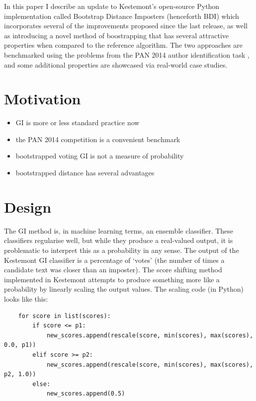 \documentclass[
    hf,
]{ceurart}
\begin{document}
In this paper I describe an update to Kestemont's open-source Python
implementation called Bootstrap Distance Imposters (henceforth BDI) which
incorporates several of the improvements proposed since the last release, as
well as introducing a novel method of boostrapping that has several attractive
properties when compared to the reference algorithm. The two approaches are
benchmarked using the problems from the PAN 2014 author identification task
\cite{pan_2014}, and some additional properties are showcased via real-world
case studies.

\section{Motivation}
\begin{itemize}
    \item GI is more or less standard practice now
    \item the PAN 2014 competition is a convenient benchmark
    \item bootstrapped voting GI is not a measure of probability
    \item bootstrapped distance has several advantages
\end{itemize}
\section{Design}

The GI method is, in machine learning terms, an ensemble classifier. These
classifiers regularise well, but while they produce a real-valued output, it is
problematic to interpret this as a probability in any sense. The output of the
Kestemont GI classifier is a percentage of `votes' (the number of times a
candidate text was closer than an imposter). The score shifting method
implemented in Kestemont attempts to produce something more like a probability
by linearly scaling the output values. The scaling code (in Python) looks like this:
\begin{verbatim}
    for score in list(scores):
        if score <= p1:
            new_scores.append(rescale(score, min(scores), max(scores), 0.0, p1))
        elif score >= p2:
            new_scores.append(rescale(score, min(scores), max(scores), p2, 1.0))
        else:
            new_scores.append(0.5)
\end{verbatim}
\end{document}
